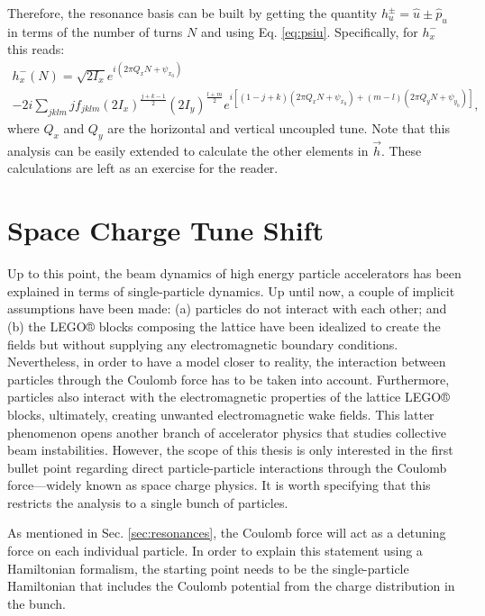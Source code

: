 Therefore, the resonance basis can be built by getting the quantity $h_u^{\pm}=\hat{u}\pm \hat{p}_u$ in terms of the number of turns $N$ and using Eq. \ref{eq:psiu}. Specifically, for $h_x^{-}$ this reads:
\begin{multline}
    \label{eq:hx-}
    h_x^{-}(N)=\sqrt{2I_x}e^{i\left( 2\pi Q_x N +\psi_{x_0}\right)} \\
    -2i \sum_{jklm} j f_{jklm} \left( 2I_x \right)^{\frac{j+k-1}{2}}\left( 2I_y \right)^{\frac{l+m}{2}}
    e^{i \left[ \left( 1-j+k\right)\left( 2\pi Q_x N + \psi_{x_0} \right) +\left( m-l\right)\left( 2\pi Q_y N + \psi_{y_0} \right)\right]},
\end{multline}
where $Q_x$ and $Q_y$ are the horizontal and vertical uncoupled tune. Note that this analysis can be easily extended to calculate the other elements in $\vec{h}$. These calculations are left as an exercise for the reader.  

\section{\label{sec:sc1}Space Charge Tune Shift}

Up to this point, the beam dynamics of high energy particle accelerators has been explained in terms of single-particle dynamics. Up until now, a couple of implicit assumptions have been made: (a) particles do not interact with each other; and (b) the LEGO® blocks composing the lattice have been idealized to create the fields but without supplying any electromagnetic boundary conditions. Nevertheless, in order to have a model closer to reality, the interaction between particles through the Coulomb force has to be taken into account. Furthermore, particles also interact with the electromagnetic properties of the lattice LEGO® blocks, ultimately, creating unwanted electromagnetic wake fields. This latter phenomenon opens another branch of accelerator physics that studies collective beam instabilities. However, the scope of this thesis is only interested in the first bullet point regarding direct particle-particle interactions through the Coulomb force---widely known as space charge physics. It is worth specifying that this restricts the analysis to a single bunch of particles. 

As mentioned in Sec. \ref{sec:resonances}, the Coulomb force will act as a detuning force on each individual particle. In order to explain this statement using a Hamiltonian formalism, the starting point needs to be the single-particle Hamiltonian \cite{witchcraft} that includes the Coulomb potential from the charge distribution in the bunch.   